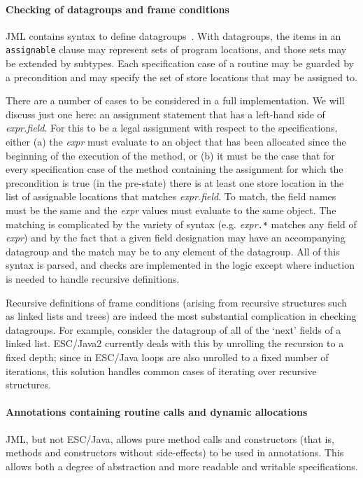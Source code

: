 \documentclass{llncs}
\begin{document}
\paragraph*{Checking of datagroups and frame conditions}
JML contains syntax to define 
datagroups~\cite{Leino-Poetzsch-Heffter-Zhou02}.  With datagroups, the items in
an \texttt{assignable} clause may represent sets of program locations,
and those sets may be extended by subtypes.  Each
specification case of a routine may be guarded by a
precondition and may specify the set of store locations that may be
assigned to.

There are a number of cases to be considered in a full implementation.
We will discuss just one here: an assignment statement that has a
left-hand side of \textit{expr.field}.  For this to be a legal
assignment with respect to the specifications, either (a) the
\textit{expr} must evaluate to an object that has been allocated since
the beginning of the execution of the method, or (b) it must be the
case that for every specification case of the method containing the
assignment for which the precondition is true (in the pre-state) there
is at least one store location in the list of assignable locations
that matches \textit{expr.field}.  To match, the field names must be
the same and the \textit{expr} values must evaluate to the same
object.  The matching is complicated by the variety of syntax (e.g.
\textit{expr}\texttt{.*} matches any field of \textit{expr}) and by
the fact that a given field designation may have an accompanying
datagroup and the match may be to any element of the datagroup.
All of this syntax is parsed, and checks are implemented in the logic except
where induction is needed to handle recursive definitions.

Recursive definitions of frame conditions (arising from recursive structures
such as linked lists and trees) are indeed the most substantial complication 
in checking datagroups.  For example,
consider the datagroup of all of the `next' fields of a linked list.
ESC/Java2 currently deals with this by unrolling the recursion to a
fixed depth; since in ESC/Java loops are also unrolled to a fixed
number of iterations, this solution handles common cases of iterating
over recursive structures.

\paragraph*{Annotations containing routine calls and dynamic allocations}
JML, but not ESC/Java, allows pure method calls and constructors (that is, methods
and constructors without side-effects) to be
used in annotations.  This allows both a degree of abstraction and
more readable and writable specifications.
\end{document}
